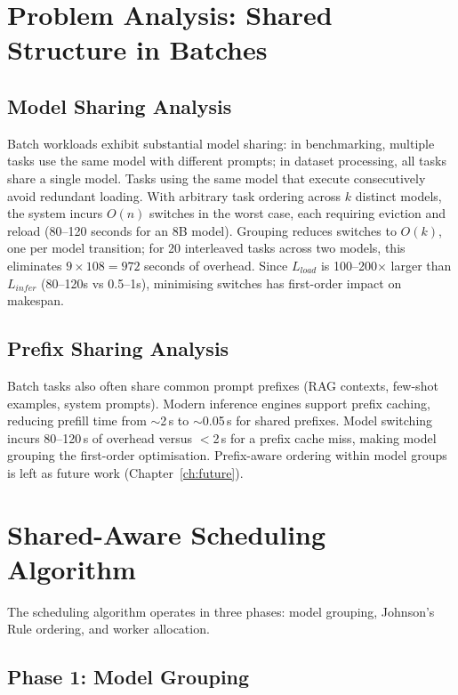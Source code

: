 \documentclass[logo,bsc,singlespacing,parskip,online]{infthesis}
\begin{document}
\section{Problem Analysis: Shared Structure in Batches}

\subsection{Model Sharing Analysis}

Batch workloads exhibit substantial model sharing: in benchmarking, multiple tasks use the same model with different prompts; in dataset processing, all tasks share a single model. Tasks using the same model that execute consecutively avoid redundant loading. With arbitrary task ordering across $k$ distinct models, the system incurs $O(n)$ switches in the worst case, each requiring eviction and reload (80--120 seconds for an 8B model). Grouping reduces switches to $O(k)$, one per model transition; for 20 interleaved tasks across two models, this eliminates $9 \times 108 = 972$ seconds of overhead. Since $L_{load}$ is 100--200$\times$ larger than $L_{infer}$ (80--120s vs 0.5--1s), minimising switches has first-order impact on makespan.

\subsection{Prefix Sharing Analysis}

Batch tasks also often share common prompt prefixes (RAG contexts, few-shot examples, system prompts). Modern inference engines support prefix caching, reducing prefill time from $\sim$2\,s to $\sim$0.05\,s for shared prefixes. Model switching incurs 80--120\,s of overhead versus $<$2\,s for a prefix cache miss, making model grouping the first-order optimisation. Prefix-aware ordering within model groups is left as future work (Chapter~\ref{ch:future}).

\section{Shared-Aware Scheduling Algorithm}

The scheduling algorithm operates in three phases: model grouping, Johnson's Rule ordering, and worker allocation.

\subsection{Phase 1: Model Grouping}
\end{document}
